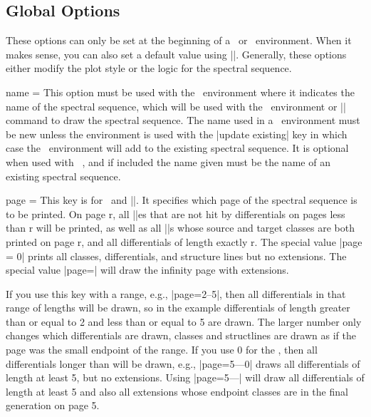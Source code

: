 \begin{sseqdata}[name = basic, cohomological Serre grading]
\section{Global Options}
These options can only be set at the beginning of a \sseqdataenv\  or
\sseqpageenv\  environment. When it makes sense, you can also set a default
value using |\sseqset|. Generally, these options either modify the plot style or
the logic for the spectral sequence.
\begin{key}{name = }%
This option must be used with the \sseqdataenv\  environment where it indicates
the name of the spectral sequence, which will be used with the \sseqpageenv\
environment or |\printpage| command to draw the spectral sequence. The name used
in a \sseqdataenv\  environment must be new unless the environment is used with
the |update existing| key in which case the \sseqdataenv\  environment will add
to the existing spectral sequence. It is optional when used with \sseqpageenv\ ,
and if included the name given must be the name of an existing spectral
sequence.
\end{key}

\begin{key}{page = }%
This key is for \sseqpageenv\  and |\printpage|. It specifies which page of the
spectral sequence is to be printed. On page r, all |\class|es that are not hit
by differentials on pages less than r will be printed, as well as all
|\structline|s whose source and target classes are both printed on page r, and
all differentials of length exactly r. The special value |page = 0| prints all
classes, differentials, and structure lines but no extensions. The special value
|page=\infty| will draw the infinity page with extensions.

If you use this key with a range, e.g., |page=2--5|, then all differentials in
that range of lengths will be drawn, so in the example differentials of length
greater than or equal to 2 and less than or equal to 5 are drawn. The larger
number only changes which differentials are drawn, classes and structlines are
drawn as if the page was the small endpoint of the range. If you use 0 for the
\meta{page max}, then all differentials longer than \meta{page number} will be
drawn, e.g., |page=5---0| draws all differentials of length at least 5, but no
extensions. Using |page=5---\infty| will draw all differentials of length at
least 5 and also all extensions whose endpoint classes are in the
final generation on page 5.
\end{key}


\end{sseqdata}
